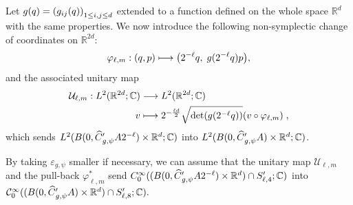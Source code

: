 \documentclass[AHL,Unicode,longabstracts]{cedram}
\newcommand{\C}{\mathbb{C}}
\newcommand{\R}{\mathbb{R}}
\newcommand{\clC}{\mathcal{C}}
\newcommand{\clU}{\mathcal{U}}
\let\oldhat\hat
\renewcommand*{\hat}[1]{\mathchoice{\widehat{#1}}{\widehat{#1}}{\oldhat{#1}}{\oldhat{#1}}}
\let\originalleft\left
\let\originalright\right
\renewcommand{\left}{\mathopen{}\mathclose\bgroup\originalleft}
\renewcommand{\right}{\aftergroup\egroup\originalright}
\renewcommand*{\to}{\mathchoice{\longrightarrow}{\rightarrow}{\rightarrow}{\rightarrow}}
\let\oldmapsto\mapsto
\renewcommand*{\mapsto}{\mathchoice{\longmapsto}{\oldmapsto}{\oldmapsto}{\oldmapsto}}
\begin{document}
Let $g(q) = \left(g_{ij}(q)\right)_{1 \le i, j \le d}$ extended to a function defined on the whole space $\R^d$ with the same properties. We now introduce the following non-symplectic change of coordinates on $\R^{2d}$:
\begin{equation}\label{eq:defvphiellm}
\varphi_{\ell,m} : (q,p) \mapsto
\left(2^{-\ell}q,\;g(2^{-\ell}q)p
\right),
\end{equation}
and the associated unitary map
\begin{align*}
\clU_{\ell,m} :
L^2(\R^{2d};\C) & \to L^2(\R^{2d} ; \C) \\
v & \mapsto 2^{-\frac{\ell d}{2}}\sqrt{\det (g(2^{-\ell}q))} (v\circ \varphi_{\ell,m}) \;,
\end{align*}
which sends $L^2(B(0, \hat{C}'_{g, \psi} A 2^{-\ell})\times\R^d;\C)$ into $L^2(B(0, \hat{C}'_{g, \psi} A) \times \R^d ; \C)$.

By taking $\varepsilon_{g,\psi}$ smaller if necessary, we can assume that the unitary map $\clU_{\ell,m}$ and the pull-back $\varphi_{\ell,m}^*$ send $C^\infty_0((B(0, \hat{C}'_{g, \psi} A 2^{-\ell}) \times \R^d) \cap S'_{\ell,4}; \C)$ into $\clC^{\infty}_0((B(0,\hat{C}'_{g,\psi}A)\times \R^d) \cap S_{\ell,8}' ;\C).$
\end{document}

